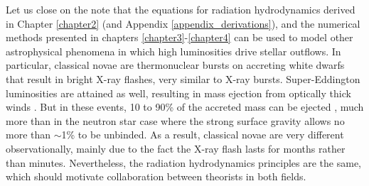 \documentclass[../main.tex]{subfiles}
\begin{document}
Let us close on the note that the equations for radiation hydrodynamics derived in Chapter \ref{chapter2} (and Appendix \ref{appendix_derivations}), and the numerical methods presented in chapters \ref{chapter3}-\ref{chapter4} can be used to model other astrophysical phenomena in which high luminosities drive stellar outflows. In particular, classical novae are thermonuclear bursts on accreting white dwarfs that result in bright X-ray flashes, very similar to X-ray bursts. Super-Eddington luminosities are attained as well, resulting in mass ejection from optically thick winds \citep{Kato1983}. But in these events, 10 to 90\% of the accreted mass can be ejected \citep{Lewin2006}, much more than in the neutron star case where the strong surface gravity allows no more than ${\sim}$1\% to be unbinded. As a result, classical novae are very different observationally, mainly due to the fact the X-ray flash lasts for months rather than minutes. Nevertheless, the radiation hydrodynamics principles are the same, which should motivate collaboration between theorists in both fields.

\biblio
\end{document}
